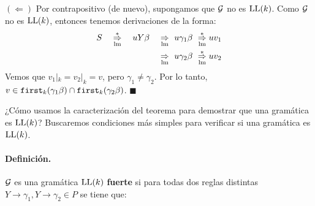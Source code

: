 $(\Leftarrow)$ Por contrapositivo (de nuevo), supongamos que $\mathcal{G}$ no es $\text{LL}(k)$. Como $\mathcal{G}$ no es $\text{LL}(k)$, entonces tenemos derivaciones de la forma:
    \begin{align*}
        S \quad \overunder{\Rightarrow}{\mathrm{lm}}{*} \quad u Y \beta \quad & \overunder{\Rightarrow}{\mathrm{lm}}{}\ u \gamma_1 \beta \ \overunder{\Rightarrow}{\mathrm{lm}}{*} u v_1 \\
                                                                              & \overunder{\Rightarrow}{\mathrm{lm}}{}\ u \gamma_2 \beta \ \overunder{\Rightarrow}{\mathrm{lm}}{*} u v_2
    \end{align*}
    Vemos que $v_1|_k = v_2|_k = v$, pero $\gamma_1 \neq \gamma_2$. Por lo tanto, $v \in \texttt{first}_k(\gamma_1 \beta) \cap \texttt{first}_k(\gamma_2 \beta)$. \hfill $\blacksquare$ \bigbreak

    ¿Cómo usamos la caracterización del teorema para demostrar que una gramática es $\text{LL}(k)$? Buscaremos condiciones más simples para verificar si una gramática es $\text{LL}(k)$.

    \paragraph{Definición.} $\mathcal{G}$ es una gramática $\text{LL}(k)$ \textbf{fuerte} si para todas dos reglas distintas $Y \to \gamma_1, Y\to \gamma_2 \in P$ se tiene que:


